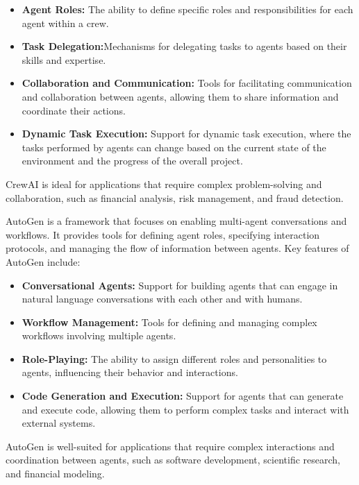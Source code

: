 \documentclass[a4paper,headinclude=on,footinclude=on,12pt,oneside]{scrbook}
\begin{document}
\begin{itemize}
\item \textbf{Agent Roles:} The ability to define specific roles and responsibilities for each agent within a crew.
\item \textbf{Task Delegation:}Mechanisms for delegating tasks to agents based on their skills and expertise.
\item \textbf{Collaboration and Communication:} Tools for facilitating communication and collaboration between agents, allowing them to share information and coordinate their actions.
\item \textbf{Dynamic Task Execution:} Support for dynamic task execution, where the tasks performed by agents can change based on the current state of the environment and the progress of the overall project.
\end{itemize}

CrewAI is ideal for applications that require complex problem-solving and collaboration, such as financial analysis, risk management, and fraud detection.


AutoGen is a framework that focuses on enabling multi-agent conversations and workflows. It provides tools for defining agent roles, specifying interaction protocols, and managing the flow of information between agents. Key features of AutoGen include:

\begin{itemize}
\item \textbf{Conversational Agents:}  Support for building agents that can engage in natural language conversations with each other and with humans.
\item \textbf{Workflow Management:} Tools for defining and managing complex workflows involving multiple agents.
\item \textbf{Role-Playing:} The ability to assign different roles and personalities to agents, influencing their behavior and interactions.
\item \textbf{Code Generation and Execution:} Support for agents that can generate and execute code, allowing them to perform complex tasks and interact with external systems.
\end{itemize}

AutoGen is well-suited for applications that require complex interactions and coordination between agents, such as software development, scientific research, and financial modeling.
\end{document}
